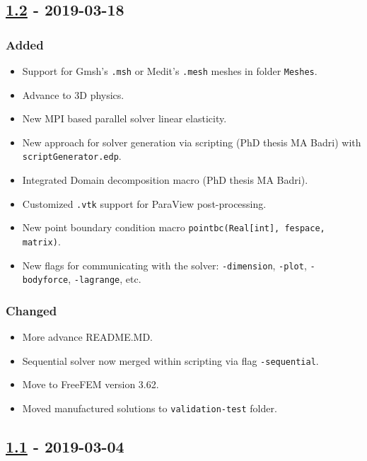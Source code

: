 \subsection{\texorpdfstring{\href{https://gitlab.com/PsdSolver/psd_sources/-/tree/v1.1}{1.2}
- 2019-03-18}{1.2 - 2019-03-18}}

\subsubsection{Added}

\begin{itemize}
\tightlist
\item
  Support for Gmsh's \lstinline!.msh! or Medit's \lstinline!.mesh!
  meshes in folder \lstinline!Meshes!.
\item
  Advance to 3D physics.
\item
  New MPI based parallel solver linear elasticity.
\item
  New approach for solver generation via scripting (PhD thesis MA Badri)
  with \lstinline!scriptGenerator.edp!.
\item
  Integrated Domain decomposition macro (PhD thesis MA Badri).
\item
  Customized \lstinline!.vtk! support for ParaView post-processing.
\item
  New point boundary condition macro
  \lstinline!pointbc(Real[int], fespace, matrix)!.
\item
  New flags for communicating with the solver: \lstinline!-dimension!,
  \lstinline!-plot!, \lstinline!-bodyforce!, \lstinline!-lagrange!, etc.
\end{itemize}

\subsubsection{Changed}

\begin{itemize}
\tightlist
\item
  More advance README.MD.
\item
  Sequential solver now merged within scripting via flag
  \lstinline!-sequential!.
\item
  Move to FreeFEM version 3.62.
\item
  Moved manufactured solutions to \lstinline!validation-test! folder.
\end{itemize}

\subsection{\texorpdfstring{\href{https://gitlab.com/PsdSolver/psd_sources/-/tree/v1.1}{1.1}
- 2019-03-04}{1.1 - 2019-03-04}}

